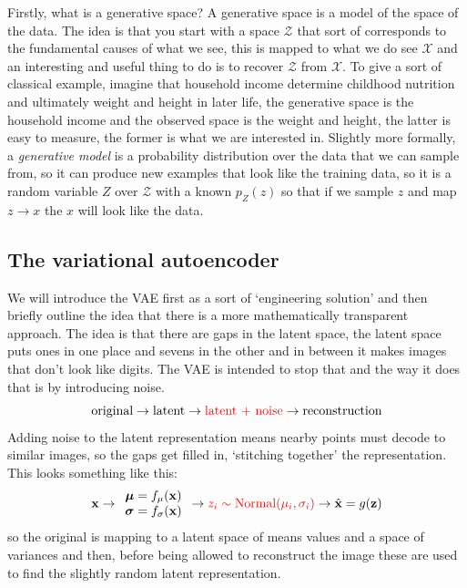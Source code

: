 \documentclass[12pt]{article}
\begin{document}
Firstly, what is a generative space? A generative space is a model of
the space of the data. The idea is that you start with a space
$\mathcal{Z}$ that sort of corresponds to the fundamental causes of
what we see, this is mapped to what we do see $\mathcal{X}$ and an
interesting and useful thing to do is to recover $\mathcal{Z}$ from
$\mathcal{X}$. To give a sort of classical example, imagine that
household income determine childhood nutrition and ultimately weight
and height in later life, the generative space is the household income
and the observed space is the weight and height, the latter is easy to
measure, the former is what we are interested in. Slightly more
formally, a \textsl{generative model} is a probability distribution
over the data that we can sample from, so it can produce new examples
that look like the training data, so it is a random variable $Z$ over
$\mathcal{Z}$ with a known $p_Z(z)$ so that if we sample $z$ and map
$z\rightarrow x$ the $x$ will look like the data.

\subsection*{The variational autoencoder}

We will introduce the VAE first as a sort of `engineering solution'
and then briefly outline the idea that there is a more mathematically
transparent approach. The idea is that there are gaps in the latent
space, the latent space puts ones in one place and sevens in the other
and in between it makes images that don't look like digits. The VAE is
intended to stop that and the way it does that is by introducing noise.
\begin{equation}
  \text{original} \rightarrow \text{latent} \rightarrow \textcolor{red}{\text{latent + noise}} \rightarrow \text{reconstruction}
\end{equation}
Adding noise to the latent representation means nearby points must
decode to similar images, so the gaps get filled in, `stitching
together' the representation. This looks something like this:
\begin{equation}
 \mathbf{x} \rightarrow
\begin{array}{c}\boldsymbol{\mu}=f_\mu(\mathbf{x})\\ \boldsymbol{\sigma}=f_\sigma(\mathbf{x})\end{array}
\rightarrow
\textcolor{red}{z_i\sim\text{Normal}(\mu_i,\sigma_i)}
\rightarrow
\hat{\mathbf{x}}=g(\mathbf{z})
\end{equation}
so the original is mapping to a latent space of means values and a
space of variances and then, before being allowed to reconstruct the
image these are used to find the slightly random latent representation.
\end{document}
